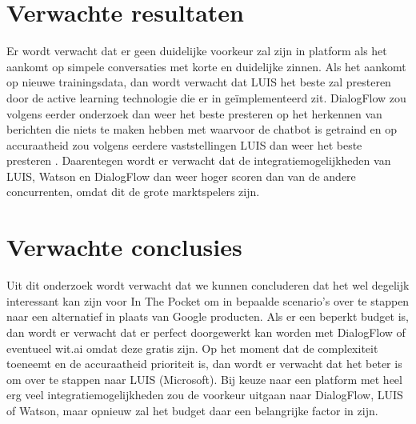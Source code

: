 \section{Verwachte resultaten}
\label{sec:verwachte_resultaten}

Er wordt verwacht dat er geen duidelijke voorkeur zal zijn in platform als het aankomt op simpele conversaties met korte en duidelijke zinnen. Als het aankomt op nieuwe trainingsdata, dan wordt verwacht dat LUIS het beste zal presteren door de active learning technologie die er in geïmplementeerd zit. DialogFlow zou volgens eerder onderzoek dan weer het beste presteren op het herkennen van berichten die niets te maken hebben met waarvoor de chatbot is getraind en op accuraatheid zou volgens eerdere vaststellingen LUIS dan weer het beste presteren \autocite{Russis2018}. Daarentegen wordt er verwacht dat de integratiemogelijkheden van LUIS, Watson en DialogFlow dan weer hoger scoren dan van de andere concurrenten, omdat dit de grote marktspelers zijn.

\section{Verwachte conclusies}
\label{sec:verwachte_conclusies}

Uit dit onderzoek wordt verwacht dat we kunnen concluderen dat het wel degelijk interessant kan zijn voor In The Pocket om in bepaalde scenario’s over te stappen naar een alternatief in plaats van Google producten. Als er een beperkt budget is, dan wordt er verwacht dat er perfect doorgewerkt kan worden met DialogFlow of eventueel wit.ai omdat deze gratis zijn. Op het moment dat de complexiteit toeneemt en de accuraatheid prioriteit is, dan wordt er verwacht dat het beter is om over te stappen naar LUIS (Microsoft). Bij keuze naar een platform met heel erg veel integratiemogelijkheden zou de voorkeur uitgaan naar DialogFlow, LUIS of Watson, maar opnieuw zal het budget daar een belangrijke factor in zijn.

